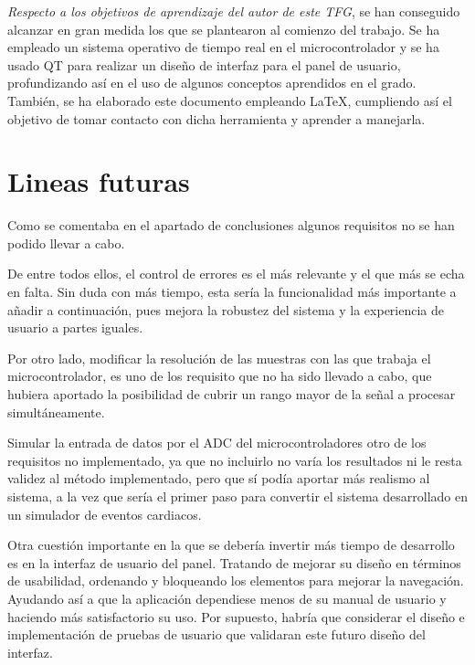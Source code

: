 \textit{Respecto a los objetivos de aprendizaje del autor de este TFG}, se han conseguido alcanzar en gran medida los que se plantearon al comienzo del trabajo. Se ha empleado un sistema operativo de tiempo real en el microcontrolador y se ha usado QT para realizar un diseño de interfaz para el panel de usuario, profundizando así en el uso de algunos conceptos aprendidos en el grado. También, se ha elaborado este documento empleando \LaTeX, cumpliendo así el objetivo de tomar contacto con dicha herramienta y aprender a manejarla.


\section{Lineas futuras}

Como se comentaba en el apartado de conclusiones algunos requisitos no se han podido llevar a cabo. 

De entre todos ellos, el control de errores es el más relevante y el que más se echa en falta. Sin duda con más tiempo, esta sería la funcionalidad más importante a añadir a continuación, pues mejora la robustez del sistema y la experiencia de usuario a partes iguales.

Por otro lado, modificar la resolución de las muestras con las que trabaja el microcontrolador, es uno de los requisito que no ha sido llevado a cabo, que hubiera aportado la posibilidad de cubrir un rango mayor de la señal a procesar simultáneamente.

Simular la entrada de datos por el ADC del microcontroladores otro de los requisitos no implementado,  ya que no incluirlo no varía los resultados ni le resta validez al método implementado, pero que sí podía aportar más realismo al sistema, a la vez que sería el primer paso para convertir el sistema desarrollado en un simulador de eventos cardiacos.

Otra cuestión importante en la que se debería invertir más tiempo de desarrollo es en la interfaz de usuario del panel. Tratando de mejorar su diseño en términos de usabilidad, ordenando y bloqueando los elementos para mejorar la navegación. Ayudando así a que la aplicación dependiese menos de su manual de usuario y haciendo más satisfactorio su uso. Por supuesto, habría que considerar el diseño e implementación de pruebas de usuario que validaran este futuro diseño del interfaz.

\chapterend
